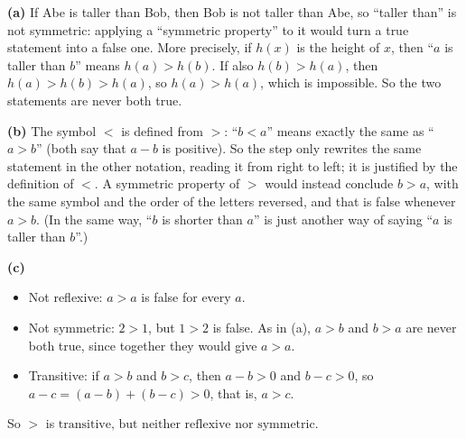 \textbf{(a)} If Abe is taller than Bob, then Bob is not taller than Abe, so ``taller than'' is not symmetric: applying a ``symmetric property'' to it would turn a true statement into a false one. More precisely, if $h(x)$ is the height of $x$, then ``$a$ is taller than $b$'' means $h(a)>h(b)$. If also $h(b)>h(a)$, then $h(a)>h(b)>h(a)$, so $h(a)>h(a)$, which is impossible. So the two statements are never both true.

\textbf{(b)} The symbol $<$ is defined from $>$: ``$b<a$'' means exactly the same as ``$a>b$'' (both say that $a-b$ is positive). So the step only rewrites the same statement in the other notation, reading it from right to left; it is justified by the definition of $<$. A symmetric property of $>$ would instead conclude $b>a$, with the same symbol and the order of the letters reversed, and that is false whenever $a>b$. (In the same way, ``$b$ is shorter than $a$'' is just another way of saying ``$a$ is taller than $b$''.)

\textbf{(c)}
\begin{itemize}
\item Not reflexive: $a>a$ is false for every $a$.
\item Not symmetric: $2>1$, but $1>2$ is false. As in (a), $a>b$ and $b>a$ are never both true, since together they would give $a>a$.
\item Transitive: if $a>b$ and $b>c$, then $a-b>0$ and $b-c>0$, so $a-c=(a-b)+(b-c)>0$, that is, $a>c$.
\end{itemize}
So $>$ is $\boxed{\text{transitive, but neither reflexive nor symmetric}}$.
